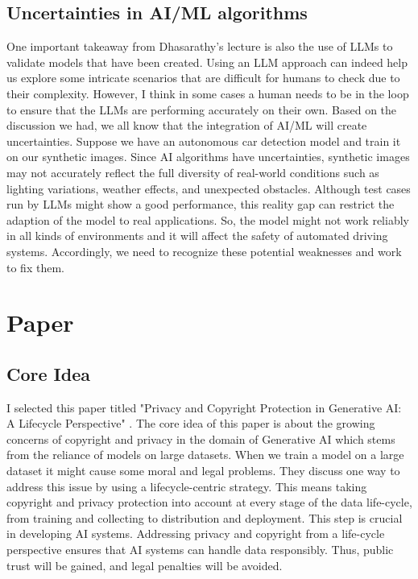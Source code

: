 \documentclass[11pt]{article}
\begin{document}
\subsection{Uncertainties in AI/ML algorithms} 
 
 One important takeaway from Dhasarathy's lecture is also the use of LLMs to validate models that have been created. Using an LLM approach can indeed help us explore some intricate scenarios that are difficult for humans to check due to their complexity. However, I think in some cases a human needs to be in the loop to ensure that the LLMs are performing accurately on their own. Based on the discussion we had, we all know that the integration of AI/ML will create uncertainties. Suppose we have an autonomous car detection model and train it on our synthetic images. Since AI algorithms have uncertainties, synthetic images may not accurately reflect the full diversity of real-world conditions such as lighting variations, weather effects, and unexpected obstacles. Although test cases run by LLMs might show a good performance, this reality gap can restrict the adaption of the model to real applications. So, the model might not work reliably in all kinds of environments and it will affect the safety of automated driving systems. Accordingly, we need to recognize these potential weaknesses and work to fix them. 



\section{Paper \cite{zhang2024privacy}}
\subsection{Core Idea} 

I selected this paper titled "Privacy and Copyright Protection in Generative AI: A Lifecycle Perspective" \cite{zhang2024privacy}. The core idea of this paper is about the growing concerns of copyright and privacy in the domain of Generative AI which stems from the reliance of models on large datasets. When we train a model on a large dataset it might cause some moral and legal problems. They discuss one way to address this issue by using a lifecycle-centric strategy. This means taking copyright and privacy protection into account at every stage of the data life-cycle, from training and collecting to distribution and deployment. This step is crucial in developing AI systems. Addressing privacy and copyright from a life-cycle perspective ensures that AI systems can handle data responsibly. Thus, public trust will be gained, and legal penalties will be avoided.
\end{document}
